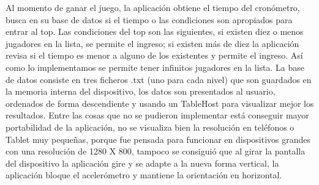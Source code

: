 \documentclass[11pt]{article} %
\begin{document}
Al momento de ganar el juego, la aplicación obtiene el tiempo del cronómetro, busca en su base de datos si el tiempo o las condiciones son apropiados para entrar al top. Las condiciones del top son las siguientes, si existen diez o menos jugadores en la lista, se permite el ingreso; si existen más de diez la aplicación revisa si el tiempo es menor a alguno de los existentes y permite el ingreso.  Así como lo implementamos se permite tener infinitos jugadores en la lista.
La base de datos consiste en tres  ficheros .txt (uno para cada nivel) que son guardados en la memoria interna del dispositivo, los datos son presentados al usuario, ordenados de forma descendiente y usando un TableHost para visualizar mejor los resultados.
Entre las cosas que no se pudieron implementar está conseguir mayor portabilidad de la aplicación, no se visualiza bien la resolución en teléfonos o Tablet muy pequeñas, porque fue pensada para funcionar en dispositivos grandes con una resolución de 1280 X 800, tampoco se consiguió que al girar la pantalla del dispositivo la aplicación gire y se adapte a la nueva forma vertical, la aplicación bloque el acelerómetro y mantiene la orientación en horizontal. 
\end{document}
